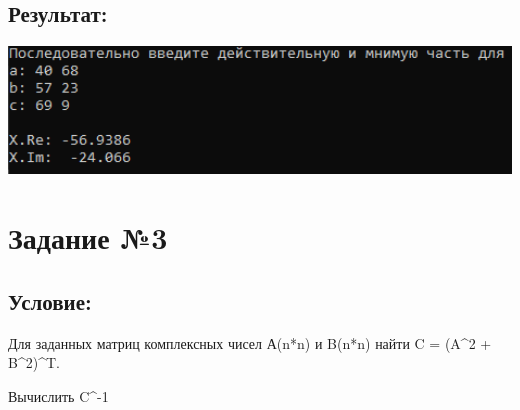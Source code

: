 \documentclass[a4paper]{article}
\begin{document}
\subsection{Результат:}
\includegraphics[width=1\textwidth]{2.png}
\newpage
\section{Задание №3} 
\subsection{Условие:}
Для заданных матриц комплексных чисел А(n*n) и B(n*n) найти C = (A^2 + B^2)^T.

Вычислить C^{-1}
\end{document}
